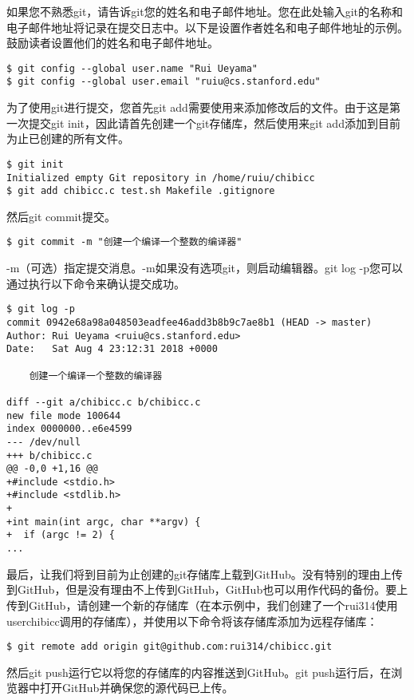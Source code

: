 \documentclass[cn,10pt,math=newtx,citestyle=gb7714-2015,bibstyle=gb7714-2015]{elegantbook}
\begin{document}
如果您不熟悉git，请告诉git您的姓名和电子邮件地址。您在此处输入git的名称和电子邮件地址将记录在提交日志中。以下是设置作者姓名和电子邮件地址的示例。鼓励读者设置他们的姓名和电子邮件地址。

\begin{verbatim}
$ git config --global user.name "Rui Ueyama"
$ git config --global user.email "ruiu@cs.stanford.edu"
\end{verbatim}

为了使用git进行提交，您首先git add需要使用来添加修改后的文件。由于这是第一次提交git init，因此请首先创建一个git存储库，然后使用来git add添加到目前为止已创建的所有文件。

\begin{verbatim}
$ git init
Initialized empty Git repository in /home/ruiu/chibicc
$ git add chibicc.c test.sh Makefile .gitignore
\end{verbatim}

然后git commit提交。

\begin{verbatim}
$ git commit -m "创建一个编译一个整数的编译器"
\end{verbatim}

-m（可选）指定提交消息。-m如果没有选项git，则启动编辑器。git log -p您可以通过执行以下命令来确认提交成功。

\begin{verbatim}
$ git log -p
commit 0942e68a98a048503eadfee46add3b8b9c7ae8b1 (HEAD -> master)
Author: Rui Ueyama <ruiu@cs.stanford.edu>
Date:   Sat Aug 4 23:12:31 2018 +0000

    创建一个编译一个整数的编译器

diff --git a/chibicc.c b/chibicc.c
new file mode 100644
index 0000000..e6e4599
--- /dev/null
+++ b/chibicc.c
@@ -0,0 +1,16 @@
+#include <stdio.h>
+#include <stdlib.h>
+
+int main(int argc, char **argv) {
+  if (argc != 2) {
...
\end{verbatim}

最后，让我们将到目前为止创建的git存储库上载到GitHub。没有特别的理由上传到GitHub，但是没有理由不上传到GitHub，GitHub也可以用作代码的备份。要上传到GitHub，请创建一个新的存储库（在本示例中，我们创建了一个rui314使用userchibicc调用的存储库），并使用以下命令将该存储库添加为远程存储库：

\begin{verbatim}
$ git remote add origin git@github.com:rui314/chibicc.git
\end{verbatim}

然后git push运行它以将您的存储库的内容推送到GitHub。git push运行后，在浏览器中打开GitHub并确保您的源代码已上传。
\end{document}
